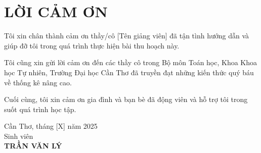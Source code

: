 \chapter*{LỜI CẢM ƠN}

Tôi xin chân thành cảm ơn thầy/cô [Tên giảng viên] đã tận tình hướng dẫn và giúp đỡ tôi trong quá trình thực hiện bài thu hoạch này.

Tôi cũng xin gửi lời cảm ơn đến các thầy cô trong Bộ môn Toán học, Khoa Khoa học Tự nhiên, Trường Đại học Cần Thơ đã truyền đạt những kiến thức quý báu về thống kê nâng cao.

Cuối cùng, tôi xin cảm ơn gia đình và bạn bè đã động viên và hỗ trợ tôi trong suốt quá trình học tập.

\vspace{2cm}
\hfill\begin{minipage}{6cm}
\centering
Cần Thơ, tháng [X] năm 2025\\
Sinh viên\\[2ex]
\textbf{TRẦN VĂN LÝ}
\end{minipage}
